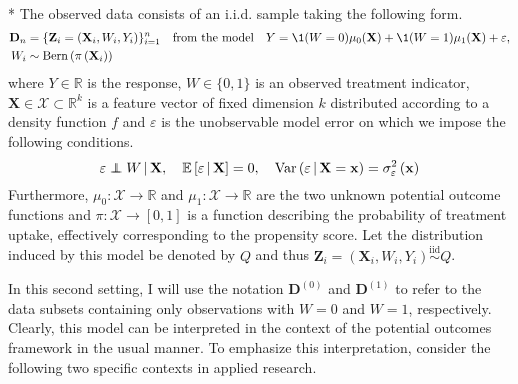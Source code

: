 \begin{boxD}
	\begin{asm}\label{asm:hte_dgp}\mbox{}\\*
		The observed data consists of an i.i.d. sample taking the following form.
		\begin{equation}\label{DGP2}
			\begin{aligned}
				\mathbf{D}_n & = \{\mathbf{Z}_i = (\mathbf{X}_i, W_i, Y_i)\}_{i = 1}^{n}
				\quad \text{from the model} \quad
				Y = \1(W = 0)\mu_{0}(\mathbf{X}) + \1(W = 1)\mu_1(\mathbf{X}) + \varepsilon,	\\
				W_i & \sim \operatorname{Bern}\left(\pi\left(\mathbf{X}_i\right)\right)
			\end{aligned}
		\end{equation}
		where $Y \in \mathbb{R}$ is the response, $W \in \{0,1\}$ is an observed treatment indicator, $\mathbf{X} \in \mathcal{X} \subset \mathbb{R}^k$ is a feature vector of fixed dimension $k$ distributed according to a density function $f$ and $\varepsilon$ is the unobservable model error on which we impose the following conditions.
		\begin{equation}
			\varepsilon \perp\!\!\!\!\perp W \, | \, \mathbf{X}, \quad
			\mathbb{E}\left[\varepsilon \, | \, \mathbf{X}\right] = 0, \quad
			\text{Var}\left(\varepsilon \, | \, \mathbf{X} = \mathbf{x}\right) = \sigma_{\varepsilon}^2\left(\mathbf{x}\right)
		\end{equation}
		Furthermore, $\mu_0:\mathcal{X} \rightarrow \mathbb{R}$ and $\mu_1:\mathcal{X} \rightarrow \mathbb{R}$ are the two unknown potential outcome functions and $\pi:\mathcal{X} \rightarrow [0,1]$ is a function describing the probability of treatment uptake, effectively corresponding to the propensity score.
		Let the distribution induced by this model be denoted by $Q$ and thus $\mathbf{Z}_i = \left(\mathbf{X}_i, W_i, Y_i\right) \overset{\text{iid}}{\sim} Q$.
	\end{asm}
\end{boxD}
In this second setting, I will use the notation $\mathbf{D}^{(0)}$ and $\mathbf{D}^{(1)}$ to refer to the data subsets containing only observations with $W = 0$ and $W = 1$, respectively.
Clearly, this model can be interpreted in the context of the potential outcomes framework in the usual manner.
To emphasize this interpretation, consider the following two specific contexts in applied research.
